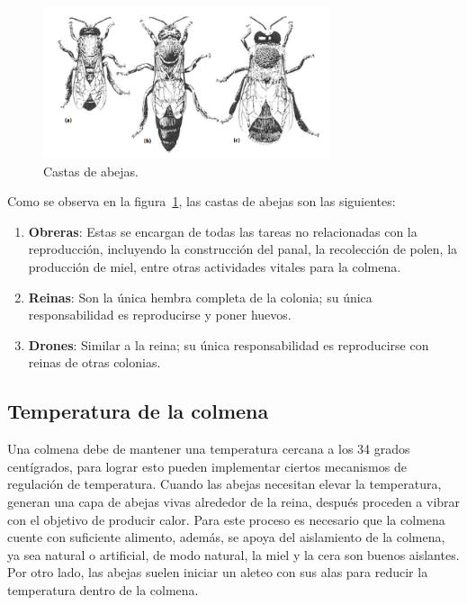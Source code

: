 \begin{figure}[htbp]
  \centering
  \includegraphics[width=0.75\textwidth]{assets/abejas.png}
  \caption{Castas de abejas. \cite{david_cramp}}
  \label{fig:abejas}
\end{figure}

Como se observa en la figura~\ref{fig:abejas}, las castas de abejas son las siguientes:
\begin{enumerate}
  \renewcommand\labelenumi{\alph{enumi})}
  \item \textbf{Obreras}: Estas se encargan de todas las tareas no relacionadas con la reproducción, incluyendo la construcción del panal, la recolección de polen, la producción de miel, entre otras actividades vitales para la colmena.
  \item \textbf{Reinas}: Son la única hembra completa de la colonia; su única responsabilidad es reproducirse y poner huevos.
  \item \textbf{Drones}: Similar a la reina; su única responsabilidad es reproducirse con reinas de otras colonias.
\end{enumerate}

\subsection{Temperatura de la colmena}
Una colmena debe de mantener una temperatura cercana a los 34 grados centígrados, para lograr esto pueden implementar ciertos mecanismos de regulación de temperatura. \cite{david_cramp}
Cuando las abejas necesitan elevar la temperatura, generan una capa de abejas vivas alrededor de la reina, después proceden a vibrar con el objetivo de producir calor. Para este proceso es necesario que la colmena cuente con suficiente alimento, además, se apoya del aislamiento de la colmena, ya sea natural o artificial, de modo natural, la miel y la cera son buenos aislantes. \cite{chadwick_alton_tennant_fitzmaurice_earl_2016}
Por otro lado, las abejas suelen iniciar un aleteo con sus alas para reducir la temperatura dentro de la colmena. \cite{chadwick_alton_tennant_fitzmaurice_earl_2016}


